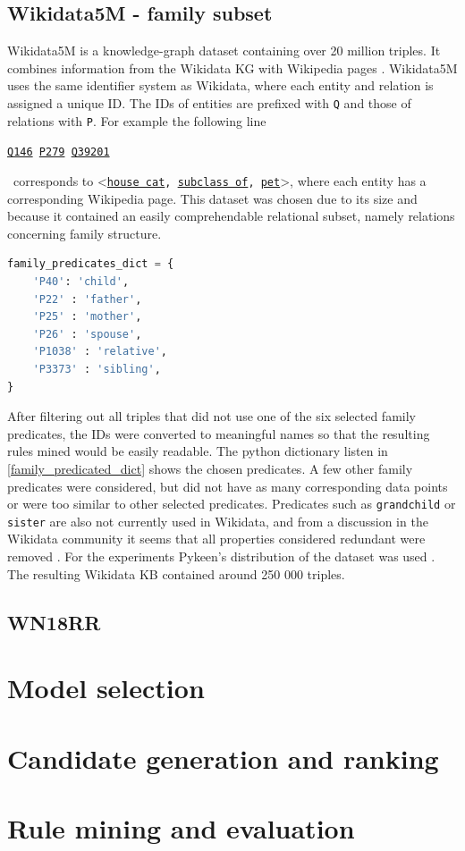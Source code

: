 \subsection{Wikidata5M - family subset}
Wikidata5M is a knowledge-graph dataset containing over 20 million triples. It combines information from the Wikidata KG with Wikipedia pages \cite{wang2019kepler}. Wikidata5M uses the same identifier system as Wikidata, where each entity and relation is assigned a unique ID. The IDs of entities are prefixed with \texttt{Q} and those of relations with \texttt{P}. For example the following line \\
\centerline{\texttt{\href{https://www.wikidata.org/wiki/Q146}{Q146} \quad \href{https://www.wikidata.org/wiki/Property:P279}{P279} \quad  \href{https://www.wikidata.org/wiki/Q39201}{Q39201}}} \
corresponds to \textless\texttt{\href{https://www.wikidata.org/wiki/Q146}{house cat}, \href{https://www.wikidata.org/wiki/Property:P279}{subclass of}, \href{https://www.wikidata.org/wiki/Q39201}{pet}}\textgreater, where each entity has a corresponding Wikipedia page.
This dataset was chosen due to its size and because it contained an easily comprehendable relational subset, namely relations concerning family structure. 
\begin{lstlisting}[language=Python, caption={Python dictionary converting family predicate IDs to their names},captionpos=t, label={family_predicated_dict}]
family_predicates_dict = {
    'P40': 'child', 
    'P22' : 'father', 
    'P25' : 'mother',
    'P26' : 'spouse', 
    'P1038' : 'relative', 
    'P3373' : 'sibling', 
}
\end{lstlisting}

After filtering out all triples that did not use one of the six selected family predicates, the IDs were converted to meaningful names so that the resulting rules mined would be easily readable. The python dictionary listen in \ref{family_predicated_dict} shows the chosen predicates. A few other family predicates were considered, but did not have as many corresponding data points or were too similar to other selected predicates. Predicates such as \texttt{grandchild} or \texttt{sister} are also not currently used in Wikidata, and from a discussion in the Wikidata community it seems that all properties considered redundant were removed \cite{kinship_discussion}. For the experiments Pykeen's distribution of the dataset was used \cite{ali2021pykeen}. The resulting Wikidata KB contained around 250 000 triples.

\subsection{WN18RR}

\section{Model selection}


\section{Candidate generation and ranking}



\section{Rule mining and evaluation}
